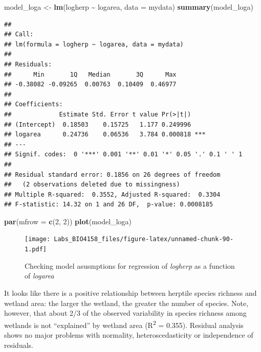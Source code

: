 \documentclass[
  12pt,
]{book}
\newenvironment{Shaded}{\begin{snugshade}}{\end{snugshade}}
\newcommand{\DataTypeTok}[1]{\textcolor[rgb]{0.13,0.29,0.53}{#1}}
\newcommand{\DecValTok}[1]{\textcolor[rgb]{0.00,0.00,0.81}{#1}}
\newcommand{\KeywordTok}[1]{\textcolor[rgb]{0.13,0.29,0.53}{\textbf{#1}}}
\newcommand{\NormalTok}[1]{#1}
\newcommand{\OperatorTok}[1]{\textcolor[rgb]{0.81,0.36,0.00}{\textbf{#1}}}
\newcommand{\StringTok}[1]{\textcolor[rgb]{0.31,0.60,0.02}{#1}}
\begin{document}
\begin{Shaded}
\begin{Highlighting}[]
\NormalTok{model\_loga \textless{}{-}}\StringTok{ }\KeywordTok{lm}\NormalTok{(logherp }\OperatorTok{\textasciitilde{}}\StringTok{ }\NormalTok{logarea, }\DataTypeTok{data =}\NormalTok{ mydata)}
\KeywordTok{summary}\NormalTok{(model\_loga)}
\end{Highlighting}
\end{Shaded}

\begin{verbatim}
## 
## Call:
## lm(formula = logherp ~ logarea, data = mydata)
## 
## Residuals:
##      Min       1Q   Median       3Q      Max 
## -0.38082 -0.09265  0.00763  0.10409  0.46977 
## 
## Coefficients:
##             Estimate Std. Error t value Pr(>|t|)    
## (Intercept)  0.18503    0.15725   1.177 0.249996    
## logarea      0.24736    0.06536   3.784 0.000818 ***
## ---
## Signif. codes:  0 '***' 0.001 '**' 0.01 '*' 0.05 '.' 0.1 ' ' 1
## 
## Residual standard error: 0.1856 on 26 degrees of freedom
##   (2 observations deleted due to missingness)
## Multiple R-squared:  0.3552, Adjusted R-squared:  0.3304 
## F-statistic: 14.32 on 1 and 26 DF,  p-value: 0.0008185
\end{verbatim}

\begin{Shaded}
\begin{Highlighting}[]
\KeywordTok{par}\NormalTok{(}\DataTypeTok{mfrow =} \KeywordTok{c}\NormalTok{(}\DecValTok{2}\NormalTok{, }\DecValTok{2}\NormalTok{))}
\KeywordTok{plot}\NormalTok{(model\_loga)}
\end{Highlighting}
\end{Shaded}

\begin{figure}
\centering
\texttt{[image: Labs\_BIO4158\_files/figure-latex/unnamed-chunk-90-1.pdf]}
\caption{\label{fig:unnamed-chunk-90}Checking model asusmptions for regression of \emph{logherp} as a function of \emph{logarea}}
\end{figure}

It looks like there is a positive relationship between herptile species richness and wetland area: the larger the wetland, the greater the number of species. Note, however, that about 2/3 of the observed variability in species richness among wetlands is not ``explained'' by wetland area (R\textsuperscript{2} = 0.355). Residual analysis shows no major problems with normality, heteroscedasticity or independence of residuals.
\end{document}
